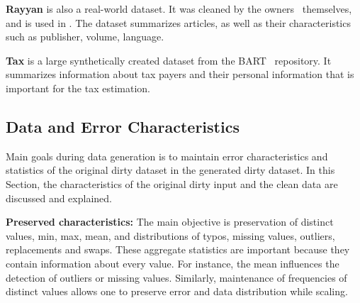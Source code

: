\textbf{Rayyan} is also a real-world dataset. 
It was cleaned by the owners~\cite{QuzzaniHFE2016} themselves, and is used in \textcite{MahdaviAFMQST2019, MahdaviA2020}.
The dataset summarizes articles, as well as their characteristics such as publisher, volume, language.

\textbf{Tax} is a large synthetically created dataset from the BART~\cite{bart} repository.
It summarizes information about tax payers and their personal information that is important for the tax estimation.

\subsection{Data and Error Characteristics}
\label{sec:data_characteristics}
Main goals during data generation is to maintain error characteristics and  statistics of the original dirty dataset in the generated dirty dataset.
In this Section, the characteristics of the original dirty input and the clean data are discussed and explained. 

\textbf{Preserved characteristics:} 
The main objective is preservation of distinct values, min, max, mean, and distributions of typos, missing values, outliers, replacements and swaps.
These aggregate statistics are important because they contain information about every value.
For instance, the mean influences the detection of outliers or missing values.
Similarly, maintenance of frequencies of distinct values allows one to preserve error and data distribution while scaling.


